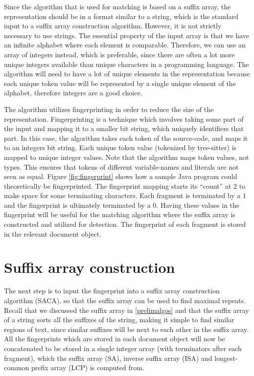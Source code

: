 Since the algorithm that is used for matching is based on a suffix array, the
representation should be in a format similar to a string, which is the standard input to a
suffix array construction algorithm. However, it is not strictly necessary to use strings.
The essential property of the input array is that we have an infinite alphabet where each
element is comparable. Therefore, we can use an array of integers instead, which is
preferable, since there are often a lot more unique integers available than unique
characters in a programming language. The algorithm will need to have a lot of unique
elements in the representation because each unique token value will be represented by
a single unique element of the alphabet, therefore integers are a good choice.


The algorithm utilizes fingerprinting in order to reduce the size of the representation.
Fingerprinting is a technique which involves taking some part of the input and mapping it
to a smaller bit string, which uniquely identifiers that part. In this case, the algorithm
takes each token of the source-code, and maps it to an integers bit string. Each unique
token value (tokenized by tree-sitter) is mapped to unique integer values. Note that the
algorithm maps token values, not types. This ensures that tokens of different
variable-names and literals are not seen as equal. Figure \ref{fig:fingerprint} shows how
a sample Java program could theoretically be fingerprinted. The fingerprint mapping starts
its ``count'' at 2 to make space for some terminating characters. Each fragment is
terminated by a $1$ and the fingerprint is ultimately terminated by a $0$. Having these
values in the fingerprint will be useful for the matching algorithm where the suffix array
is constructed and utilized for detection. The fingerprint of each fragment is stored in
the relevant document object.


\section{Suffix array construction}


The next step is to input the fingerprint into a suffix array construction algorithm
(SACA), so that the suffix array can be used to find maximal repeats. Recall that we
discussed the suffix array in \cref{prelimalgos} and that the suffix array of a string
sorts all the suffixes of the string, making it simple to find similar regions of text,
since similar suffixes will be next to each other in the suffix array. All the
fingerprints which are stored in each document object will now be concatenated to be
stored in a single integer array (with terminators after each fragment), which the suffix
array (SA), inverse suffix array (ISA) and longest-common prefix array (LCP) is computed
from.

